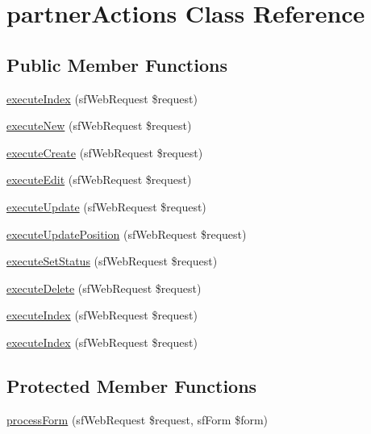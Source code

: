 \hypertarget{classpartner_actions}{\section{partner\-Actions Class Reference}
\label{classpartner_actions}
}
\subsection*{Public Member Functions}
\begin{DoxyCompactItemize}
\item 
\hyperlink{classpartner_actions_a948cc911eb1d9f77990be54af3b2080f}{execute\-Index} (sf\-Web\-Request \$request)
\item 
\hyperlink{classpartner_actions_a0ffbea56560c6c633dae68ec22aff21c}{execute\-New} (sf\-Web\-Request \$request)
\item 
\hyperlink{classpartner_actions_a75837617743fb64dca82d8133b2c662a}{execute\-Create} (sf\-Web\-Request \$request)
\item 
\hyperlink{classpartner_actions_af4d8fedd4b28f3398826a1bb8fa54394}{execute\-Edit} (sf\-Web\-Request \$request)
\item 
\hyperlink{classpartner_actions_af7b4f51862add3c2ebb54efc136a0840}{execute\-Update} (sf\-Web\-Request \$request)
\item 
\hyperlink{classpartner_actions_acae2fa1cffde05d8c0331ca062d5ee54}{execute\-Update\-Position} (sf\-Web\-Request \$request)
\item 
\hyperlink{classpartner_actions_a365ffe9a4c547cdb81d9e2131e7bd7b9}{execute\-Set\-Status} (sf\-Web\-Request \$request)
\item 
\hyperlink{classpartner_actions_a52b5b11b11a0070dd2662257520c045a}{execute\-Delete} (sf\-Web\-Request \$request)
\item 
\hyperlink{classpartner_actions_a948cc911eb1d9f77990be54af3b2080f}{execute\-Index} (sf\-Web\-Request \$request)
\item 
\hyperlink{classpartner_actions_a948cc911eb1d9f77990be54af3b2080f}{execute\-Index} (sf\-Web\-Request \$request)
\end{DoxyCompactItemize}
\subsection*{Protected Member Functions}
\begin{DoxyCompactItemize}
\item 
\hyperlink{classpartner_actions_a7cf661d837626e0320753cbffa019a01}{process\-Form} (sf\-Web\-Request \$request, sf\-Form \$form)
\end{DoxyCompactItemize}


